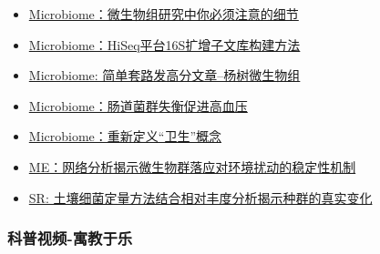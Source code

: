 \documentclass[]{article}
\numberwithin{figure}{section}
\numberwithin{table}{section}
\begin{document}
\begin{itemize}
\item
  \href{http://mp.weixin.qq.com/s/m1znPpGR6NbewL2AtJkKPw}{Microbiome：微生物组研究中你必须注意的细节}\\
\item
  \href{http://mp.weixin.qq.com/s/E1qMskVQ64y6MKE8zDvNmQ}{Microbiome：HiSeq平台16S扩增子文库构建方法}\\
\item
  \href{http://mp.weixin.qq.com/s/Zod4Ca1tk3y5lIdI6RCiQQ}{Microbiome: 简单套路发高分文章--杨树微生物组}\\
\item
  \href{http://mp.weixin.qq.com/s/n5u-Vm5e53x7XcxwYDbTRQ}{Microbiome：肠道菌群失衡促进高血压}\\
\item
  \href{http://mp.weixin.qq.com/s/jiQsN3sPgbJcdVa-SuSvGQ}{Microbiome：重新定义``卫生''概念}
\item
  \href{http://mp.weixin.qq.com/s/649mjxr62v9RHp3AGWLzpg}{ME：网络分析揭示微生物群落应对环境扰动的稳定性机制}
\item
  \href{http://mp.weixin.qq.com/s/ipBhAagpEPn1EIKXDUlGRw}{SR: 土壤细菌定量方法结合相对丰度分析揭示种群的真实变化}
\end{itemize}

\hypertarget{ux79d1ux666eux89c6ux9891-ux5bd3ux6559ux4e8eux4e50}{%
\subsubsection{科普视频-寓教于乐}\label{ux79d1ux666eux89c6ux9891-ux5bd3ux6559ux4e8eux4e50}}
\end{document}
